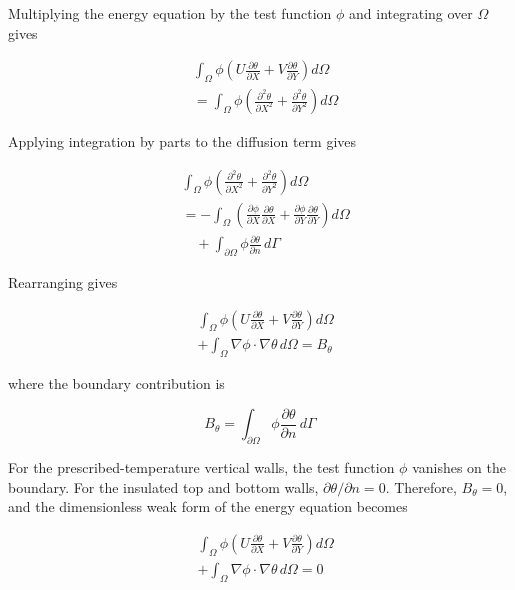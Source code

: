 \documentclass[preprint,3p,number]{elsarticle}
\begin{document}
Multiplying the energy equation by the test function $\phi$
and integrating over $\Omega$ gives

\begin{align}
&\int_{\Omega}\phi
\left(
U\frac{\partial\theta}{\partial X}
+V\frac{\partial\theta}{\partial Y}
\right)d\Omega \nonumber\\
&=\int_{\Omega}\phi
\left(
\frac{\partial^2\theta}{\partial X^2}
+\frac{\partial^2\theta}{\partial Y^2}
\right)d\Omega
\end{align}

Applying integration by parts to the diffusion term gives

\begin{align}
&\int_{\Omega}\phi
\left(
\frac{\partial^2\theta}{\partial X^2}
+\frac{\partial^2\theta}{\partial Y^2}
\right)d\Omega \nonumber\\
&=-\int_{\Omega}
\left(
\frac{\partial\phi}{\partial X}
\frac{\partial\theta}{\partial X}
+\frac{\partial\phi}{\partial Y}
\frac{\partial\theta}{\partial Y}
\right)d\Omega \nonumber\\
&\quad+\int_{\partial\Omega}
\phi\frac{\partial\theta}{\partial n}\,d\Gamma
\end{align}

Rearranging gives

\begin{align}
&\int_{\Omega}\phi
\left(
U\frac{\partial\theta}{\partial X}
+V\frac{\partial\theta}{\partial Y}
\right)d\Omega \nonumber\\
&+\int_{\Omega}\nabla\phi\cdot\nabla\theta\,d\Omega
=B_\theta
\end{align}

where the boundary contribution is

\begin{equation}
B_\theta=
\int_{\partial\Omega}
\phi\frac{\partial\theta}{\partial n}\,d\Gamma
\end{equation}

For the prescribed-temperature vertical walls, the test function
$\phi$ vanishes on the boundary. For the insulated top and bottom
walls, $\partial\theta/\partial n=0$. Therefore, $B_\theta=0$,
and the dimensionless weak form of the energy equation becomes

\begin{equation}
\boxed{
\begin{aligned}
&\int_{\Omega}\phi
\left(
U\frac{\partial\theta}{\partial X}
+V\frac{\partial\theta}{\partial Y}
\right)d\Omega\\
&+\int_{\Omega}\nabla\phi\cdot\nabla\theta\,d\Omega=0
\end{aligned}
}
\end{equation}
\end{document}
